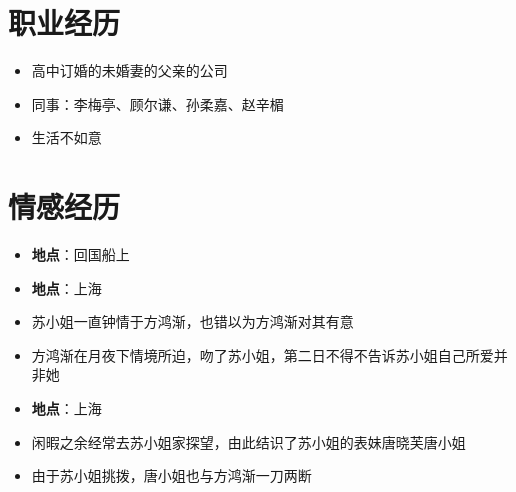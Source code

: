 \documentclass{resume}
\begin{document}
\section{职业经历}

\begin{itemize}[parsep=0.5ex]
  \item 高中订婚的未婚妻的父亲的公司
\end{itemize}

\begin{itemize}[parsep=0.5ex]
  \item 同事：李梅亭、顾尔谦、孙柔嘉、赵辛楣
\end{itemize}

\begin{itemize}[parsep=0.5ex]
  \item 生活不如意
\end{itemize}

\section{情感经历}

\begin{itemize}[parsep=0.5ex]
  \item \textbf{地点}：回国船上
\end{itemize}

\begin{itemize}[parsep=0.5ex]
  \item \textbf{地点}：上海
  \item 苏小姐一直钟情于方鸿渐，也错以为方鸿渐对其有意
  \item 方鸿渐在月夜下情境所迫，吻了苏小姐，第二日不得不告诉苏小姐自己所爱并非她
\end{itemize}

\begin{itemize}[parsep=0.5ex]
  \item \textbf{地点}：上海
  \item 闲暇之余经常去苏小姐家探望，由此结识了苏小姐的表妹唐晓芙唐小姐
  \item 由于苏小姐挑拨，唐小姐也与方鸿渐一刀两断
\end{itemize}
\end{document}

